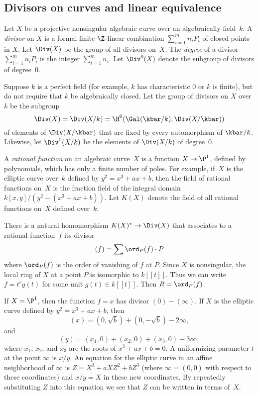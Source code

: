 \documentclass{report}
\begin{document}
\subsection{Divisors on curves and linear equivalence}
Let $X$ be a projective nonsingular algebraic curve over an
algebraically field~$k$.  A {\em divisor} on $X$ is a formal
finite $\Z$-linear combination $\sum_{i=1}^m n_i P_i$ of closed
points in $X$.   Let $\Div(X)$ be the group of all divisors
on~$X$.  The {\em degree} of a divisor $\sum_{i=1}^m n_i P_i$ is
the integer $\sum_{i=1}^m n_i$.  Let $\Div^0(X)$ denote the
subgroup of divisors of degree~$0$.

Suppose $k$ is a perfect field (for example, $k$ has
characteristic $0$ or $k$ is finite), but do not require that $k$
be algebraically closed. Let the group of divisors on $X$ over~$k$
be the subgroup
\[
  \Div(X) = \Div(X/k) = \H^0(\Gal(\kbar/k),\Div(X/\kbar))
\]
of elements of $\Div(X/\kbar)$ that are fixed by every
automorphism of $\kbar/k$.  Likewise, let $\Div^0(X/k)$ be the
elements of $\Div(X/k)$ of degree~$0$.

A {\em rational function} on an algebraic curve~$X$ is a function
$X\to \P^1$, defined by polynomials, which has only a finite
number of poles.  For example, if~$X$ is the elliptic curve
over~$k$ defined by $y^2=x^3+ax+b$, then the field of rational
functions on~$X$ is the fraction field of the integral domain
$k[x,y]/(y^2-(x^3+ax+b))$.  Let $K(X)$ denote the field of all
rational functions on~$X$ defined over~$k$.

There is a natural homomorphism $K(X)^* \to \Div(X)$ that
associates to a rational function~$f$ its divisor
\[
(f) = \sum \ord_P(f) \cdot P
\]
where $\ord_P(f)$ is the order of vanishing of $f$ at $P$. Since
$X$ is nonsingular, the local ring of $X$ at a point $P$ is
isomorphic to $k[[t]]$.  Thus we can write $f=t^r g(t)$ for some
unit $g(t)\in k[[t]]$.  Then $R=\ord_P(f)$.

\begin{example}
If $X=\P^1$, then the function $f=x$ has divisor $(0)-(\infty)$.
If $X$ is the elliptic curve defined by $y^2=x^3+ax+b$, then
\[
 (x) = (0,\sqrt{b}) + (0,-\sqrt{b}) - 2 \infty,
\]
and
\[
 (y) = (x_1,0) + (x_2,0) + (x_3,0) - 3 \infty,
\]
where $x_1$, $x_2$, and $x_3$ are the roots of $x^3+ax+b=0$. A
uniformizing parameter $t$ at the point $\infty$ is $x/y$.  An
equation for the elliptic curve in an affine neighborhood of
$\infty$ is $Z=X^3+aXZ^2+bZ^3$ (where $\infty=(0,0)$ with respect
to these coordinates) and $x/y=X$ in these new coordinates.   By
repeatedly substituting $Z$ into this equation we see that $Z$ can
be written in terms of~$X$.
\end{example}
\end{document}
